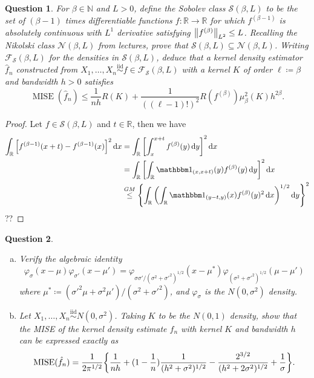 \documentclass{article}
\theoremstyle{plain}
\newtheorem{question}{Question}
\theoremstyle{remark}
\renewcommand{\phi}{\varphi}
\newcommand{\Bb}{\mathbb}
\newcommand{\Cal}{\mathcal}
\newcommand{\Rm}{\mathrm}
\newcommand{\NN}{\Bb N}
\newcommand{\RR}{\Bb R}
\newcommand\FF{\Cal F}
\newcommand\Nn{\Cal N}
\renewcommand\SS{\Cal S}
\newcommand\ceq\coloneqq %
\newcommand\ind{\mathbbm 1} %
\newcommand\iid{\overset{\Rm{iid}}{\sim}}
\DeclareMathOperator\MISE{MISE}
\begin{document}
\begin{question}
	For $\beta \in \NN$ and $L > 0$, define the \emph{Sobolev class} $\SS(\beta, L)$ to be the set of $(\beta - 1)$ times differentiable functions $f \colon \RR \to \RR$ for which $f^{(\beta - 1)}$ is absolutely continuous with $L^1$ derivative satisfying $\norm{f^{(\beta)}}_{L^2} \leq L$. Recalling the Nikolski class $\Nn(\beta, L)$ from lectures, prove that $\SS(\beta, L) \subseteq \Nn(\beta, L)$. Writing $\FF_\SS(\beta, L)$ for the densities in $\SS(\beta, L)$, deduce that a kernel density estimator $\hat f_n$ constructed from $X_1, \dotsc, X_n \iid f \in \FF_\SS(\beta, L)$ with a kernel $K$ of order $\ell \ceq \beta$ and bandwidth $h > 0$ satisfies
	\[
	\MISE(\hat f_n) \leq \frac1{nh} R(K) + \frac1{((\ell - 1)!)^2} R(f^{(\beta)}) \mu_\beta^2(K) h^{2\beta}. 
	\]
\end{question}

\begin{proof}
	Let $f \in \SS(\beta, L)$ and $t \in \RR$, then we have 
	\begin{align*}
		\int_\RR \qty[f^{(\beta - 1)}(x + t) - f^{(\beta - 1)}(x)]^2 \dd{x} &= \int_\RR \qty[\int_x^{x+t} f^{(\beta)}(y) \dd{y}]^2 \dd{x} \\
		&= \int_\RR \qty[ \int_\RR \ind_{(x, x+t)}(y) f^{(\beta)}(y) \dd{y} ]^2 \dd{x} \\
		&\overset{GM}\leq  \qty{ \int_\RR \qty( \int_\RR \ind_{(y-t, y)}(x) f^{(\beta)}(y)^2 \dd{x})^{1/2} \dd{y}}^2 
	\end{align*}
??
\end{proof}

\begin{question}
	\begin{enumerate}[(a)]
		\item 	Verify the algebraic identity
		\[
		\phi_\sigma(x-\mu)\phi_{\sigma'}(x-\mu') = \phi_{\sigma\sigma'/(\sigma^2 + \sigma'^2)^{1/2}}(x - \mu^*) \phi_{(\sigma^2 + \sigma'^2)^{1/2}}(\mu - \mu')
		\]
		where $\mu^* \ceq (\sigma'^2 \mu + \sigma^2\mu') / (\sigma^2 + \sigma'^2)$, and $\phi_\sigma$ is the $N(0, \sigma^2)$ density. 
		
		\item Let $X_1, \dotsc, X_n \iid N(0, \sigma^2)$. Taking $K$ to be the $N(0, 1)$ density, show that the MISE of the kernel density estimate $\hat f_n$ with kernel $K$ and bandwidth $h$ can be expressed exactly as
		\[
		\MISE(\hat f_n) = \frac1{2\pi^{1/2}} \qty{\frac1{nh} + (1 - \frac1n) \frac{1}{(h^2 + \sigma^2)^{1/2}} - \frac{2^{3/2}}{(h^2 + 2\sigma^2)^{1/2}} + \frac1\sigma}. 
		\]
	\end{enumerate}

\end{question}
\end{document}
